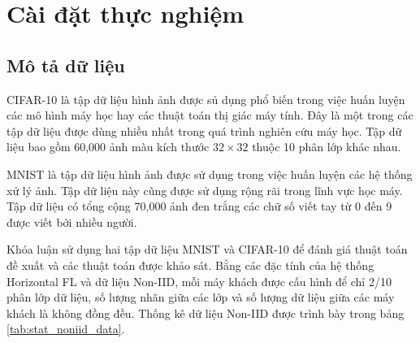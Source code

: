 \chapter{Cài đặt thực nghiệm}
\label{Chapter4}

\section{Mô tả dữ liệu}

CIFAR-10 \cite{cifar-10} là tập dữ liệu hình ảnh được sủ dụng phổ biến trong việc huấn luyện các mô hình máy học hay các thuật toán thị giác máy tính. Đây là một trong các tập dữ liệu được dùng nhiều nhất trong quá trình nghiên cứu máy học. Tập dữ liệu bao gồm 60,000 ảnh màu kích thước $32\times 32$ thuộc 10 phân lớp khác nhau.

MNIST \cite{mnist} là tập dữ liệu hình ảnh được sử dụng trong việc huấn luyện các hệ thống xử lý ảnh. Tập dữ liệu này cũng được sử dụng rộng rãi trong lĩnh vực học máy. Tập dữ liệu có tổng cộng 70,000 ảnh đen trắng các chữ số viết tay từ 0 đến 9 được viết bởi nhiều người.

Khóa luận sử dụng hai tập dữ liệu MNIST và CIFAR-10 để đánh giá thuật toán đề xuất và các thuật toán được khảo sát. Bằng các đặc tính của hệ thống Horizontal FL và dữ liệu Non-IID, mỗi máy khách được cấu hình để chỉ 2/10 phân lớp dữ liệu, số lượng nhãn giữa các lớp và số lượng dữ liệu giữa các máy khách là không đồng đều. Thống kê dữ liệu Non-IID được trình bày trong bảng \ref{tab:stat_noniid_data}.

\begin{table}
    \caption{Thống kê trên hai tập dữ liệu MNIST và CIFAR-10 (dữ liệu Non-IID)}
    \label{tab:stat_noniid_data}
\end{table}

